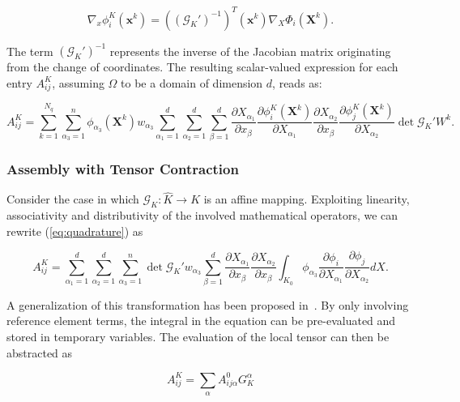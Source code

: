 \begin{equation}
\nabla_x \phi_i^K(\boldsymbol{x}^k) = ((\mathcal{G}_K')^{-1})^{T}(\boldsymbol{x}^k) \nabla_X \Phi_i(\boldsymbol{X}^k).
\end{equation}

The term $(\mathcal{G}_K')^{-1}$ represents the inverse of the Jacobian matrix originating from the change of coordinates. The resulting scalar-valued expression for each entry $A_{ij}^K$, assuming $\Omega$ to be a domain of dimension $d$, reads as:

\begin{equation}
\label{eq:quadrature}
A_{ij}^K = \sum_{k=1}^{N_q} \sum_{\alpha_3=1}^n \phi_{\alpha_3}(\boldsymbol{X}^k) w_{\alpha_3} \sum_{\alpha_1=1}^d \sum_{\alpha_2=1}^d \sum_{\beta=1}^d \frac{\partial X_{\alpha_1}}{\partial x_{\beta}} \frac{\partial \phi_i^K(\boldsymbol{X}^k)}{\partial X_{\alpha_1}} \frac{\partial X_{\alpha_2}}{\partial x_{\beta}} \frac{\partial \phi_j^K(\boldsymbol{X}^k)}{\partial X_{\alpha_2}} \operatorname{det} \mathcal{G}_K' W^k.
\end{equation}


\subsubsection{Assembly with Tensor Contraction}
Consider the case in which $\mathcal{G}_K : \hat{K} \rightarrow K$ is an affine mapping. Exploiting linearity, associativity and distributivity of the involved mathematical operators, we can rewrite (\ref{eq:quadrature}) as

\begin{equation}
\label{eq:tensor}
A_{ij}^K = \sum_{\alpha_1=1}^d \sum_{\alpha_2=1}^d \sum_{\alpha_3=1}^n \operatorname{det} \mathcal{G}_K' w_{\alpha_3} \sum_{\beta=1}^d \frac{\partial X_{\alpha_1}}{\partial x_{\beta}} \frac{\partial X_{\alpha_2}}{\partial x_{\beta}} \int_{K_0} \phi_{\alpha_3} \frac{\partial \phi_{i}}{\partial X_{\alpha_1}} \frac{\partial \phi_{j}}{\partial X_{\alpha_2}} dX.
\end{equation}

A generalization of this transformation has been proposed in~\cite{FFC-TC}. By only involving reference element terms, the integral in the equation can be pre-evaluated and stored in temporary variables. The evaluation of the local tensor can then be abstracted as

\begin{equation}
A_{ij}^K = \sum_{\alpha} A_{i j \alpha}^0 G_{K}^\alpha
\end{equation}

